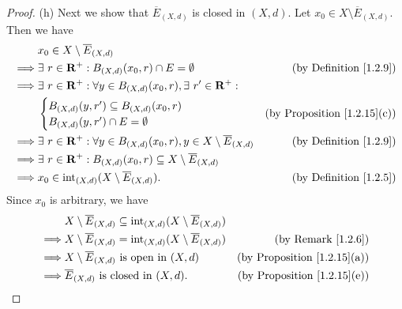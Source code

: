 \begin{proof}{(h)}
    Next we show that \(\overline{E}_{(X, d)}\) is closed in \((X, d)\).
    Let \(x_0 \in X \setminus \overline{E}_{(X, d)}\).
    Then we have
    \begin{align*}
                 & x_0 \in X \setminus \overline{E}_{(X, d)}                                                                                                    \\
        \implies & \exists\ r \in \mathbf{R}^+ : B_{(X, d)}(x_0, r) \cap E = \emptyset                                     & \text{(by Definition \ref{1.2.9})} \\
        \implies & \exists\ r \in \mathbf{R}^+ : \forall y \in B_{(X, d)}(x_0, r), \exists\ r' \in \mathbf{R}^+ :                                               \\
                 & \begin{cases}
                       B_{(X, d)}(y, r') \subseteq B_{(X, d)}(x_0, r) \\
                       B_{(X, d)}(y, r') \cap E = \emptyset
                   \end{cases}                                                       & \text{(by Proposition \ref{1.2.15}(c))}                                  \\
        \implies & \exists\ r \in \mathbf{R}^+ : \forall y \in B_{(X, d)}(x_0, r), y \in X \setminus \overline{E}_{(X, d)} & \text{(by Definition \ref{1.2.9})} \\
        \implies & \exists\ r \in \mathbf{R}^+ : B_{(X, d)}(x_0, r) \subseteq X \setminus \overline{E}_{(X, d)}                                                 \\
        \implies & x_0 \in \text{int}_{(X, d)}(X \setminus \overline{E}_{(X, d)}).                                         & \text{(by Definition \ref{1.2.5})}
    \end{align*}
    Since \(x_0\) is arbitrary, we have
    \begin{align*}
                 & X \setminus \overline{E}_{(X, d)} \subseteq \text{int}_{(X, d)}(X \setminus \overline{E}_{(X, d)})                                           \\
        \implies & X \setminus \overline{E}_{(X, d)} = \text{int}_{(X, d)}(X \setminus \overline{E}_{(X, d)})         & \text{(by Remark \ref{1.2.6})}          \\
        \implies & X \setminus \overline{E}_{(X, d)} \text{ is open in } (X, d)                                       & \text{(by Proposition \ref{1.2.15}(a))} \\
        \implies & \overline{E}_{(X, d)} \text{ is closed in } (X, d).                                                & \text{(by Proposition \ref{1.2.15}(e))}
    \end{align*}


\end{proof}
